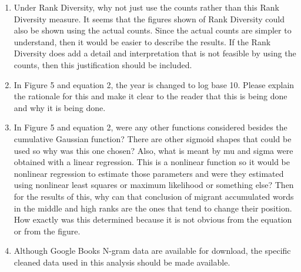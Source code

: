 \documentclass{article}
\begin{document}
\begin{enumerate}
		\item Under Rank Diversity, why not just use the counts rather than this
		Rank Diversity measure. It seems that the figures shown of Rank
		Diversity could also be shown using the actual counts. Since the
		actual counts are simpler to understand, then it would be easier to
		describe the results. If the Rank Diversity does add a detail and
		interpretation that is not feasible by using the counts, then this
		justification should be included.
		
		\item  In Figure 5 and equation 2, the year is changed to log base 10.
		Please explain the rationale for this and make it clear to the reader
		that this is being done and why it is being done.
		
		\item  In Figure 5 and equation 2, were any other functions considered
		besides the cumulative Gaussian function? There are other sigmoid
		shapes that could be used so why was this one chosen? Also, what is
		meant by mu and sigma were obtained with a linear regression. This is
		a nonlinear function so it would be nonlinear regression to estimate
		those parameters and were they estimated using nonlinear least squares
		or maximum likelihood or something else? Then for the results of this,
		why can that conclusion of migrant accumulated words in the middle and
		high ranks are the ones that tend to change their position. How
		exactly was this determined because it is not obvious from the
		equation or from the figure.
		
		\item  Although Google Books N-gram data are available for download, the
		specific cleaned data used in this analysis should be made available.
		
		
		
	\end{enumerate}
	
\end{document}
